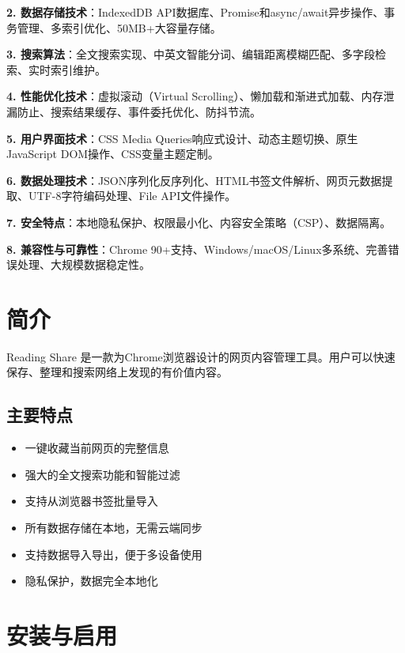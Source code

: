 \documentclass[10pt,a4paper]{article}
\begin{document}
\textbf{2. 数据存储技术}：IndexedDB API数据库、Promise和async/await异步操作、事务管理、多索引优化、50MB+大容量存储。

\textbf{3. 搜索算法}：全文搜索实现、中英文智能分词、编辑距离模糊匹配、多字段检索、实时索引维护。

\textbf{4. 性能优化技术}：虚拟滚动（Virtual Scrolling）、懒加载和渐进式加载、内存泄漏防止、搜索结果缓存、事件委托优化、防抖节流。

\textbf{5. 用户界面技术}：CSS Media Queries响应式设计、动态主题切换、原生JavaScript DOM操作、CSS变量主题定制。

\textbf{6. 数据处理技术}：JSON序列化反序列化、HTML书签文件解析、网页元数据提取、UTF-8字符编码处理、File API文件操作。

\textbf{7. 安全特点}：本地隐私保护、权限最小化、内容安全策略（CSP）、数据隔离。

\textbf{8. 兼容性与可靠性}：Chrome 90+支持、Windows/macOS/Linux多系统、完善错误处理、大规模数据稳定性。

\vspace{10pt}

\section{简介}

Reading Share 是一款为Chrome浏览器设计的网页内容管理工具。用户可以快速保存、整理和搜索网络上发现的有价值内容。

\subsection{主要特点}
\begin{itemize}
  \item 一键收藏当前网页的完整信息
  \item 强大的全文搜索功能和智能过滤
  \item 支持从浏览器书签批量导入
  \item 所有数据存储在本地，无需云端同步
  \item 支持数据导入导出，便于多设备使用
  \item 隐私保护，数据完全本地化
\end{itemize}

\vspace{5pt}

\section{安装与启用}
\end{document}
